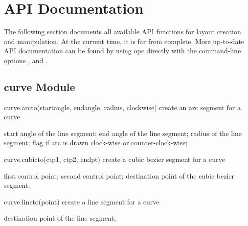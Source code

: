 \cleardoublepage

\section{API Documentation}

The following section documents all available API functions for layout creation and manipulation.
At the current time, it is far from complete.
More up-to-date API documentation can be found by using opc directly with the command-line options ,  and .

\subsection{curve Module}
\begin{APIfunc}{curve.arcto(startangle, endangle, radius, clockwise)}
    create an arc segment for a curve
    \begin{APIparameters}
            start angle of the line segment;
            end angle of the line segment;
            radius of the line segment;
            flag if arc is drawn clock-wise or counter-clock-wise;
    \end{APIparameters}
\end{APIfunc}
\begin{APIfunc}{curve.cubicto(ctp1, ctp2, endpt)}
    create a cubic bezier segment for a curve
    \begin{APIparameters}
            first control point;
            second control point;
            destination point of the cubic bezier segment;
    \end{APIparameters}
\end{APIfunc}
\begin{APIfunc}{curve.lineto(point)}
    create a line segment for a curve
    \begin{APIparameters}
            destination point of the line segment;
    \end{APIparameters}
\end{APIfunc}
